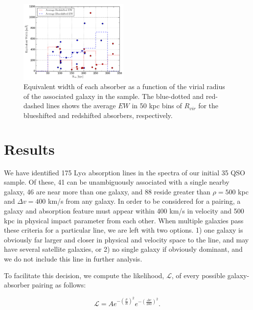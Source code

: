 \documentclass[iop]{emulateapj-rtx4}
\begin{document}
\begin{figure}[h!]
        \centering
        \includegraphics[width=0.48\textwidth]{W(vir)_avgHistograms.pdf}
        \caption{\small{Equivalent width of each absorber as a function of the virial radius of the associated galaxy in the sample. The blue-dotted and red-dashed lines shows the average $EW$ in 50 kpc bins of $R_{vir}$ for the blueshifted and redshifted absorbers, respectively.}}
        \label{w_vir}
        \vspace{5pt}
\end{figure}

\vspace{10pt}


\section{Results}

We have identified 175 Ly$\alpha$ absorption lines in the spectra of our initial 35 QSO sample. Of these, 41 can be unambiguously associated with a single nearby galaxy, 46 are near more than one galaxy, and 88 reside greater than $\rho = 500$ kpc and $\Delta v = 400$ km/s from any galaxy. In order to be considered for a pairing, a galaxy and absorption feature must appear within 400 km/s in velocity and 500 kpc in physical impact parameter from each other. When multiple galaxies pass these criteria for a particular line, we are left with two options. 1) one galaxy is obviously far larger and closer in physical and velocity space to the line, and may have several satellite galaxies, or 2) no single galaxy if obviously dominant, and we do not include this line in further analysis. 

To facilitate this decision, we compute the likelihood, $\mathcal{L}$, of every possible galaxy-absorber pairing as follows:

\begin{equation}
	\mathcal{L} = A e^{-(\frac{\rho}{R})^2} e^{-(\frac{\Delta v}{200})^2}.
\end{equation}
\end{document}
